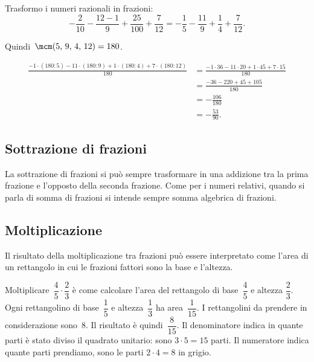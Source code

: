 \begin{exrig}
\begin{esempio}
Trasformo i numeri razionali in frazioni: 
\[-\frac{2}{10}-\frac{12-1}{9}+\frac{25}{100}+\frac{7}{12}=-\frac{1}{5}-\frac{11}{9}+\frac{1}{4}+\frac{7}{12}.\]

Quindi~$\mcm(5\text{,~}9\text{,~}4\text{,~}12)=180$.

\begin{align*}
\frac{-1\cdot(180:5)-11\cdot(180:9)+1\cdot(180:4)+7\cdot(180:12)}{180}&=
\frac{-1\cdot36-11\cdot20+1\cdot45+7\cdot15}{180}\\
&=\frac{-36-220+45+105}{180}\\
&=-\frac{106}{180} \\
&=-\frac{53}{90}.
\end{align*}
\end{esempio}
\end{exrig}

\subsection{Sottrazione di frazioni}

La sottrazione di frazioni si può sempre trasformare in una addizione tra la prima frazione e
l'opposto della seconda frazione. Come per i numeri relativi, quando si parla di
somma di frazioni si intende sempre somma algebrica di frazioni.

\vspazio\ovalbox{\risolvii \ref{ese:3.46}, \ref{ese:3.47}, \ref{ese:3.48}, \ref{ese:3.49}, \ref{ese:3.50}, \ref{ese:3.51}}

\subsection{Moltiplicazione}

Il risultato della moltiplicazione tra frazioni può essere interpretato come l'area di un rettangolo in cui
le frazioni fattori sono la base e l'altezza.
\begin{center}
 
\end{center}

Moltiplicare~$\dfrac{4}{5}\cdot\dfrac{2}{3}$ è come calcolare l'area del rettangolo di base~$\dfrac{4}{5}$ e altezza
$\dfrac{2}{3}$. 
Ogni rettangolino di base~$\dfrac{1}{5}$ e altezza~$\dfrac{1}{3}$ ha area~$\dfrac{1}{15}$.
I rettangolini da prendere in considerazione sono~8. Il risultato è quindi~$\dfrac{8}{15}$. 
Il denominatore indica in quante parti è stato diviso il quadrato unitario: sono $3 \cdot 5=15$ parti.
Il numeratore indica quante parti prendiamo, sono le parti $2\cdot 4=8$ in grigio. 

